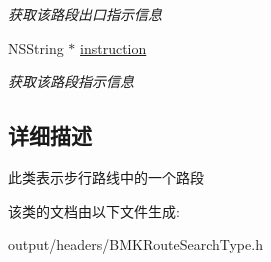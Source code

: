 \begin{DoxyCompactItemize}
\begin{DoxyCompactList}\small\item\em 获取该路段出口指示信息 \end{DoxyCompactList}\item 
\hypertarget{interface_b_m_k_walking_step_ac55da8a1ca91a2b9d3bce4ddb711cf8e}{}N\+S\+String $\ast$ \hyperlink{interface_b_m_k_walking_step_ac55da8a1ca91a2b9d3bce4ddb711cf8e}{instruction}\label{interface_b_m_k_walking_step_ac55da8a1ca91a2b9d3bce4ddb711cf8e}

\begin{DoxyCompactList}\small\item\em 获取该路段指示信息 \end{DoxyCompactList}\end{DoxyCompactItemize}


\subsection{详细描述}
此类表示步行路线中的一个路段 

该类的文档由以下文件生成\+:\begin{DoxyCompactItemize}
\item 
output/headers/B\+M\+K\+Route\+Search\+Type.\+h\end{DoxyCompactItemize}
